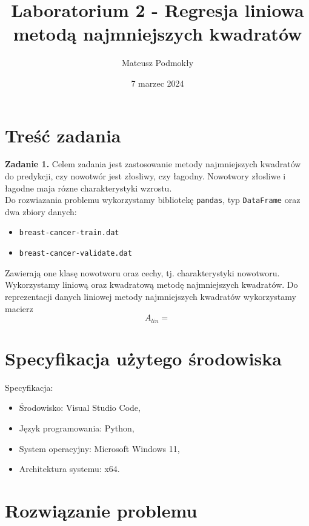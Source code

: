 \documentclass[11pt]{scrartcl}
\title{Laboratorium 2 - Regresja liniowa metodą najmniejszych kwadratów}
\author{Mateusz Podmokły}
\date{7 marzec 2024}
\begin{document}
    \maketitle

    \section{Treść zadania}
    \textbf{Zadanie 1.} Celem zadania jest zastosowanie metody najmniejszych kwadratów
    do predykcji, czy nowotwór jest złosliwy, czy łagodny. Nowotwory złosliwe i łagodne
    maja rózne charakterystyki wzrostu. \\
    Do rozwiazania problemu wykorzystamy bibliotekę \texttt{pandas}, typ
    \texttt{DataFrame} oraz dwa zbiory danych:
    \begin{itemize}[label=--]
        \item \texttt{breast-cancer-train.dat}
        \item \texttt{breast-cancer-validate.dat}
    \end{itemize}
    Zawierają one klasę nowotworu oraz cechy, tj. charakterystyki nowotworu. \\
    Wykorzystamy liniową oraz kwadratową metodę najmniejszych kwadratów. Do
    reprezentacji danych liniowej metody najmniejszych kwadratów wykorzystamy macierz
    \[
        A_{lin}=
    \]

    \section{Specyfikacja użytego środowiska}
    Specyfikacja:

    \begin{itemize}
        \item Środowisko: Visual Studio Code,
        \item Język programowania: Python,
        \item System operacyjny: Microsoft Windows 11,
        \item Architektura systemu: x64.
    \end{itemize}

    \section{Rozwiązanie problemu}
\end{document}
